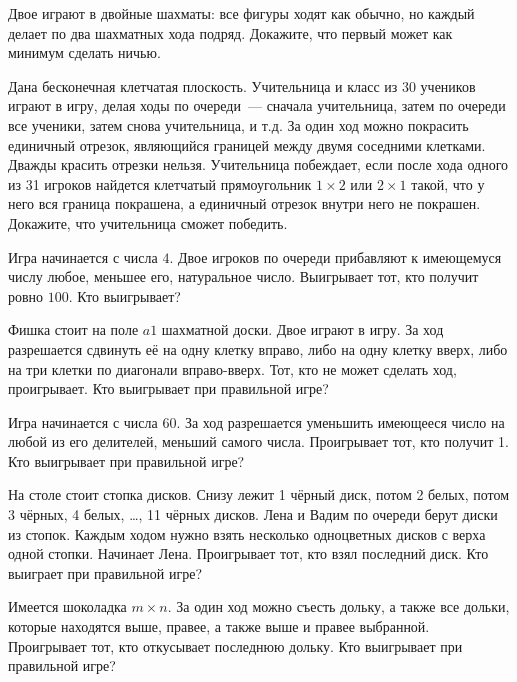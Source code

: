 \documentclass{article}
\begin{document}
\begin{enumerate_boxed}
        \item Двое играют в двойные шахматы: все фигуры ходят как обычно, но каждый делает по два шахматных хода подряд.
        Докажите, что первый может как минимум сделать ничью.

        \item Дана бесконечная клетчатая плоскость.
        Учительница и класс из 30 учеников играют в игру, делая ходы по очереди~--- сначала учительница, затем по очереди все ученики, затем снова учительница, и т.д.
        За один ход можно покрасить единичный отрезок, являющийся границей между двумя соседними клетками.
        Дважды красить отрезки нельзя.
        Учительница побеждает, если после хода одного из 31 игроков найдется клетчатый прямоугольник $1 \times 2$ или $2 \times 1$ такой, что у него вся граница покрашена, а единичный отрезок внутри него не покрашен.
        Докажите, что учительница сможет победить.

        \item Игра начинается с числа $4$.
        Двое игроков по очереди прибавляют к имеющемуся числу любое, меньшее его, натуральное число.
        Выигрывает тот, кто получит ровно $100$.
        Кто выигрывает?

        \item Фишка стоит на поле $a1$ шахматной доски.
        Двое играют в игру.
        За ход разрешается сдвинуть её на одну клетку вправо, либо на одну клетку вверх, либо на три клетки по диагонали вправо-вверх.
        Тот, кто не может сделать ход, проигрывает.
        Кто выигрывает при правильной игре?

        \item Игра начинается с числа $60$.
        За ход разрешается уменьшить имеющееся число на любой из его делителей, меньший самого числа.
        Проигрывает тот, кто получит 1.
        Кто выигрывает при правильной игре?

        \item На столе стоит стопка дисков.
        Снизу лежит 1 чёрный диск, потом 2 белых, потом 3 чёрных, 4 белых, \ldots, 11 чёрных дисков.
        Лена и Вадим по очереди берут диски из стопок.
        Каждым ходом нужно взять несколько одноцветных дисков с верха одной стопки.
        Начинает Лена.
        Проигрывает тот, кто взял последний диск.
        Кто выиграет при правильной игре?

        \item Имеется шоколадка $m \times n$.
        За один ход можно съесть дольку, а также все дольки, которые находятся выше, правее, а также выше и правее выбранной.
        Проигрывает тот, кто откусывает последнюю дольку.
        Кто выигрывает при правильной игре?


\end{enumerate_boxed}
\end{document}
